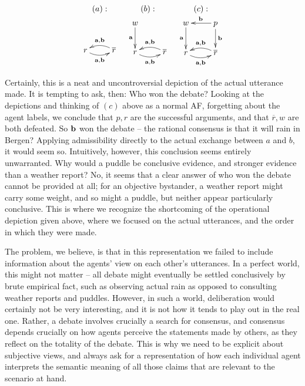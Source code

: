 \documentclass[greybox]{svmult}
\renewcommand{\bar}[1]{\overline{#1}}
\begin{document}
\begin{example}
$$
\begin{array}{ccc}
(a): & (b): & (c): \\
\xymatrix{ \\ r\ar@/_/[r]_{{\bf a},{\bf b}} & \bar{r}\ar@/_/[l]_{{\bf a},{\bf b}} } &
\xymatrix{
        w\ar[d]_{{\bf a}} & \\
        r\ar@/_/[r]_{{\bf a},{\bf b}} & \bar{r}\ar@/_/[l]_{{\bf a},{\bf b}} } &
\xymatrix{
        w\ar[d]_{{\bf a}} & p \ar[l]_{{\bf b}} \ar[d]^{{\bf b}} \\
        r\ar@/_/[r]_{{\bf a},{\bf b}} & \bar{r}\ar@/_/[l]_{{\bf a},{\bf b}} }
\end{array}
$$

Certainly, this is a neat and uncontroversial depiction of the actual utterance made. It is tempting to ask, then: Who won the debate? Looking at the depictions and thinking of $(c)$ above as a normal AF, forgetting about the agent labels, we conclude that $p, r$ are the successful arguments, and that $\bar r, w$ are both defeated. So ${\bf b}$ won the debate -- the rational consensus is that it will rain in Bergen? Applying admissibility directly to the actual exchange between $a$ and $b$, it would seem so. Intuitively, however, this conclusion seems entirely unwarranted. Why would a puddle be conclusive evidence, and stronger evidence than a weather report? No, it seems that a clear answer of who won the debate cannot be provided at all; for an objective bystander, a weather report might carry some weight, and so might a puddle, but neither appear  particularly conclusive. This is where we recognize the shortcoming of the operational depiction given above, where we focused on the actual utterances, and the order in which they were made.

The problem, we believe, is that in this representation we failed to include information about the agents' view on each other's utterances. In a perfect world, this might not matter -- all debate might eventually be settled conclusively by brute empirical fact, such as observing actual rain as opposed to consulting weather reports and puddles. However, in such a world, deliberation would certainly not be very interesting, and it is not how it tends to play out in the real one. Rather, a debate involves crucially a search for consensus, and consensus depends crucially on how agents perceive the statements made by others, as they reflect on the totality of the debate. This is why we need to be explicit about subjective views, and always ask for a representation of how each individual agent interprets the semantic meaning of all those claims that are relevant to the scenario at hand.


\end{example}
\end{document}
